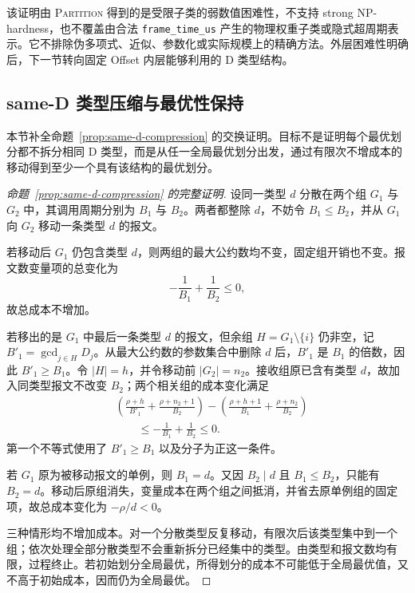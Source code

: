 \documentclass[UTF8,a4paper,twoside,zihao=-4]{ctexart}
\numberwithin{equation}{section}
\numberwithin{figure}{section}
\numberwithin{table}{section}
\theoremstyle{definition}
\numberwithin{algocf}{section}
\begin{document}
该证明由 \textsc{Partition} 得到的是受限子类的弱数值困难性，不支持 strong NP-hardness，也不覆盖由合法 \texttt{frame\_time\_us} 产生的物理权重子类或隐式超周期表示。它不排除伪多项式、近似、参数化或实际规模上的精确方法。外层困难性明确后，下一节转向固定 Offset 内层能够利用的 D 类型结构。

\subsection{same-D 类型压缩与最优性保持}
\label{subsec:appendix-same-d-compression-proof}

本节补全命题~\ref{prop:same-d-compression} 的交换证明。目标不是证明每个最优划分都不拆分相同 D 类型，而是从任一全局最优划分出发，通过有限次不增成本的移动得到至少一个具有该结构的最优划分。

\begin{proof}[命题~\ref{prop:same-d-compression} 的完整证明]
设同一类型 $d$ 分散在两个组 $G_1$ 与 $G_2$ 中，其调用周期分别为 $B_1$ 与 $B_2$。两者都整除 $d$，不妨令 $B_1\le B_2$，并从 $G_1$ 向 $G_2$ 移动一条类型 $d$ 的报文。

若移动后 $G_1$ 仍包含类型 $d$，则两组的最大公约数均不变，固定组开销也不变。报文数变量项的总变化为
\begin{equation}
 -\frac{1}{B_1}+\frac{1}{B_2}\le 0,
\label{eq:appendix-same-d-case-one}
\end{equation}
故总成本不增加。

若移出的是 $G_1$ 中最后一条类型 $d$ 的报文，但余组 $H=G_1\setminus\{i\}$ 仍非空，记 $B'_1=\gcd_{j\in H}D_j$。从最大公约数的参数集合中删除 $d$ 后，$B'_1$ 是 $B_1$ 的倍数，因此 $B'_1\ge B_1$。令 $|H|=h$，并令移动前 $|G_2|=n_2$。接收组原已含有类型 $d$，故加入同类型报文不改变 $B_2$；两个相关组的成本变化满足
\begin{equation}
 \begin{aligned}
 &\left(
   \frac{\rho+h}{B'_1}
   +\frac{\rho+n_2+1}{B_2}
  \right)
 -\left(
   \frac{\rho+h+1}{B_1}
   +\frac{\rho+n_2}{B_2}
  \right)\\
 &\qquad\le
 -\frac{1}{B_1}+\frac{1}{B_2}
 \le0.
 \end{aligned}
\label{eq:appendix-same-d-case-two}
\end{equation}
第一个不等式使用了 $B'_1\ge B_1$ 以及分子为正这一条件。

若 $G_1$ 原为被移动报文的单例，则 $B_1=d$。又因 $B_2\mid d$ 且 $B_1\le B_2$，只能有 $B_2=d$。移动后原组消失，变量成本在两个组之间抵消，并省去原单例组的固定项，故总成本变化为 $-\rho/d<0$。

三种情形均不增加成本。对一个分散类型反复移动，有限次后该类型集中到一个组；依次处理全部分散类型不会重新拆分已经集中的类型。由类型和报文数均有限，过程终止。若初始划分全局最优，所得划分的成本不可能低于全局最优值，又不高于初始成本，因而仍为全局最优。
\end{proof}
\end{document}
